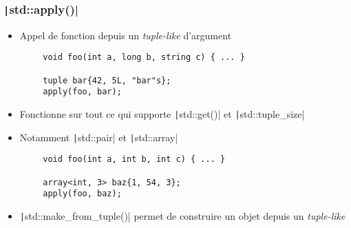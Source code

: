 \documentclass[C++.tex]{subfiles}
\begin{document}
\begin{frame}[fragile]
	\frametitle{\texttt|std::apply()|}
	\begin{itemize}
		\item Appel de fonction depuis un \textit{tuple-like} d'argument
	\end{itemize}

	\begin{verbatim}
		void foo(int a, long b, string c) { ... }

		tuple bar{42, 5L, "bar"s};
		apply(foo, bar);
	\end{verbatim}

	\begin{itemize}
		\item Fonctionne sur tout ce qui supporte \texttt|std::get()| et \texttt|std::tuple_size|
		\item Notamment \texttt|std::pair| et \texttt|std::array|
	\end{itemize}

	\begin{verbatim}
		void foo(int a, int b, int c) { ... }

		array<int, 3> baz{1, 54, 3};
		apply(foo, baz);
	\end{verbatim}

	\begin{itemize}
		\item \texttt|std::make_from_tuple()| permet de construire un objet depuis un \textit{tuple-like}
	\end{itemize}



\end{frame}
\end{document}
